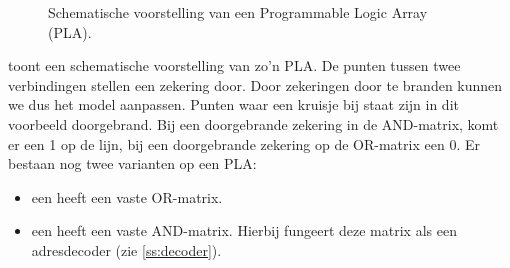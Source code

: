\begin{figure}[hbt]
\caption{Schematische voorstelling van een Programmable Logic Array (PLA).}
\label{fig:plaSchema}
\end{figure}
toont een schematische voorstelling van zo'n PLA. De punten tussen twee verbindingen stellen een zekering door. Door zekeringen door te branden kunnen we dus het model aanpassen. Punten waar een kruisje bij staat zijn in dit voorbeeld doorgebrand. Bij een doorgebrande zekering in de AND-matrix, komt er een 1 op de lijn, bij een doorgebrande zekering op de OR-matrix een 0. Er bestaan nog twee varianten op een PLA:
\begin{itemize}
 \item een  heeft een vaste OR-matrix.
 \item een  heeft een vaste AND-matrix. Hierbij fungeert deze matrix als een adresdecoder (zie \ref{ss:decoder}).
\end{itemize}
